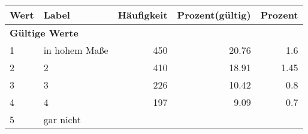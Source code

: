      \begin{longtable}{lXrrr}
     \toprule
     \textbf{Wert} & \textbf{Label} & \textbf{Häufigkeit} & \textbf{Prozent(gültig)} & \textbf{Prozent} \\
     \endhead
     \midrule
     \multicolumn{5}{l}{\textbf{Gültige Werte}}\\

     1 &
     \multicolumn{1}{X}{ in hohem Maße   } &


       \num{450} &
       \num[round-mode=places,round-precision=2]{20,76} &
         \num[round-mode=places,round-precision=2]{1,6} \\

     2 &
     \multicolumn{1}{X}{ 2   } &


       \num{410} &
       \num[round-mode=places,round-precision=2]{18,91} &
         \num[round-mode=places,round-precision=2]{1,45} \\

     3 &
     \multicolumn{1}{X}{ 3   } &


       \num{226} &
       \num[round-mode=places,round-precision=2]{10,42} &
         \num[round-mode=places,round-precision=2]{0,8} \\

     4 &
     \multicolumn{1}{X}{ 4   } &


       \num{197} &
       \num[round-mode=places,round-precision=2]{9,09} &
         \num[round-mode=places,round-precision=2]{0,7} \\

     5 &
     \multicolumn{1}{X}{ gar nicht   } &



\end{longtable}
